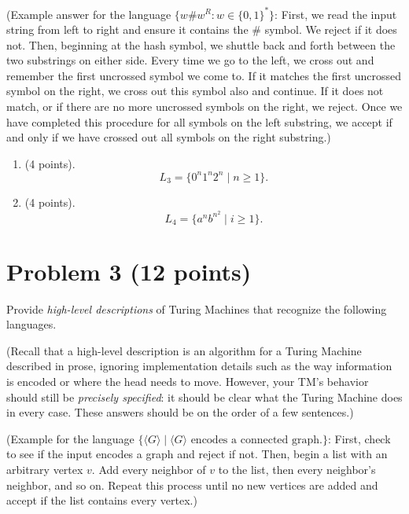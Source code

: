 \documentclass[letterpaper,11pt,twoside]{article}
\theoremstyle{plain}
\theoremstyle{definition}
\theoremstyle{remark}
\theoremstyle{restate}
\begin{document}
(Example answer for the language $\{w\#w^R : w \in \{0,1\}^*\}$: 
First, we read the input string from left to right and ensure it contains the $\#$ symbol. We reject if it does not. Then, beginning at the hash symbol, we shuttle back and forth between the two substrings on either side. Every time we go to the left, we cross out and remember the first uncrossed symbol we come to. If it matches the first uncrossed symbol on the right, we cross out this symbol also and continue. If it does not match, or if there are no more uncrossed symbols on the right, we reject. Once we have completed this procedure for all symbols on the left substring, we accept if and only if we have crossed out all symbols on the right substring.)

\begin{enumerate}
    \item (4 points).
    \[
        L_3 = \{0^n1^n2^n \; | \; n \geq 1\}.
    \]
    
    \item (4 points).
    \[
        L_4 = \{a^nb^{n^2} \; | \; i \geq 1\}.
    \]
\end{enumerate}

\clearpage
\section{Problem 3 (12 points)}
Provide \emph{high-level descriptions} of Turing Machines that recognize the following languages. 

(Recall that a high-level description is an algorithm for a Turing Machine described in prose, ignoring implementation details such as the way information is encoded or where the head needs to move. However, your TM's behavior should still be \emph{precisely specified}: it should be clear what the Turing Machine does in every case. These answers should be on the order of a few sentences.)

(Example for the language $\{\langle G\rangle \; | \; \langle G \rangle \text{ encodes a connected graph.}\}$: First, check to see if the input encodes a graph and reject if not. Then, begin a list with an arbitrary vertex $v$. Add every neighbor of $v$ to the list, then every neighbor's neighbor, and so on. Repeat this process until no new vertices are added and accept if the list contains every vertex.) 
\end{document}
